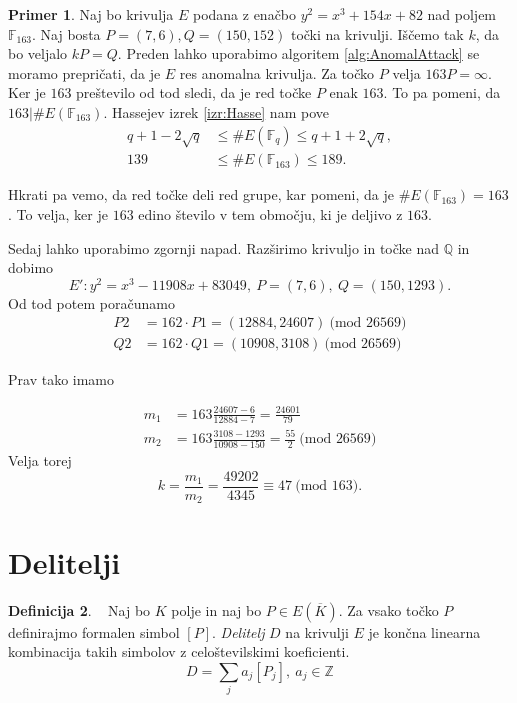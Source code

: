 \documentclass[12pt,a4paper,twoside]{article}
\theoremstyle{definition} %
\newtheorem{definicija}{Definicija}[section]
\newtheorem{primer}[definicija]{Primer}
\theoremstyle{plain} %
\numberwithin{equation}{section}  %
\newcommand{\Z}{\mathbb Z}
\newcommand{\Q}{\mathbb Q}
\newcommand{\F}{\mathbb F}
\newcommand{\E}[1]{E({#1})}
\newcommand{\MOD}[1]{\ \text{(mod }{#1}\text{)}}
\begin{document}
\begin{primer}

Naj bo krivulja $E$ podana z enačbo $y^2=x^3+154x+82$ nad poljem $\F_{163}$. Naj bosta $P = (7,6),Q = (150,152)$ točki na krivulji. Iščemo tak $k$, da bo veljalo $kP=Q$. Preden lahko uporabimo algoritem \ref{alg:AnomalAttack} se moramo prepričati, da je $E$ res anomalna krivulja. Za točko $P$ velja $163P = \infty$. Ker je $163$ preštevilo od tod sledi, da je red točke $P$ enak $163$. To pa pomeni, da $163|\#\E{\F_{163}}$. Hassejev izrek \ref{izr:Hasse} nam pove 
\begin{align}
q+1-2\sqrt{q} &{}\leq \#\E{\F_q} \leq q+1+2\sqrt{q}, \nonumber \\
139 &{}\leq \#\E{\F_{163}} \leq 189. \nonumber
\end{align}

Hkrati pa vemo, da red točke deli red grupe, kar pomeni, da je $\#\E{\F_{163}} = 163$. To velja, ker je $163$ edino število v tem območju, ki je deljivo z $163$.

Sedaj lahko uporabimo zgornji napad. Razširimo krivuljo in točke nad $\Q$ in dobimo
$$E': y^2 = x^3-11908x+83049, \ P =(7,6), \ Q=(150,1293).$$
Od tod potem poračunamo
\begin{align}
P2 &{}= 162\cdot P1 = (12884,24607) \MOD{26569} \nonumber \\
Q2 &{}= 162\cdot Q1 = (10908,3108) \MOD{26569} \nonumber
\end{align}

Prav tako imamo

\begin{align}
m_1 &{}= 163\frac{24607-6}{12884-7} = \frac{24601}{79} \nonumber \\
m_2 &{}= 163\frac{3108-1293}{10908-150} = \frac{55}{2} \MOD{26569} \nonumber
\end{align}
 Velja torej
$$k = \frac{m_1}{m_2} = \frac{49202}{4345} \equiv 47 \MOD{163}.$$
\end{primer}

\section{Delitelji}

\begin{definicija}~
Naj bo $K$ polje in naj bo $P \in \E{\overline{K}}$. Za vsako točko $P$ definirajmo formalen simbol $[P]$. \emph{Delitelj} $D$ na krivulji $E$ je končna linearna kombinacija takih simbolov z celoštevilskimi koeficienti.
$$D = \sum_{j}a_j[P_j], \ a_j \in \Z $$

\end{definicija}
\end{document}
